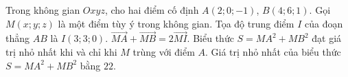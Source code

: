\begin{ex}
Trong không gian $Oxyz$, cho hai điểm cố định $A(2;0;-1)$, $B(4;6;1)$. Gọi $M(x;y;z)$ là một điểm tùy ý trong không gian.
\choiceTF
{\True Tọa độ trung điểm $I$ của đoạn thẳng $AB$ là $I(3;3;0)$.}
{\True $\overrightarrow{MA}+\overrightarrow{MB}=2\overrightarrow{MI}$.}
{Biểu thức $S=MA^2+MB^2$ đạt giá trị nhỏ nhất khi và chỉ khi $M$ trùng với điểm $A$.}
{\True Giá trị nhỏ nhất của biểu thức $S=MA^2+MB^2$ bằng $22$.}
\end{ex}
